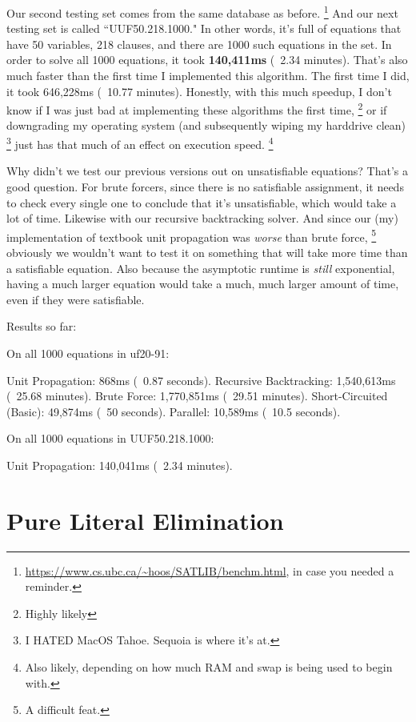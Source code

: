 \documentclass[../main.tex]{subfiles}
\begin{document}
Our second testing set comes from the same database as before.
\footnote{\url{https://www.cs.ubc.ca/~hoos/SATLIB/benchm.html}, in case you needed a reminder.}
And our next testing set is called ``UUF50.218.1000." In other words, it's full of equations that 
have 50 variables, 218 clauses, and there are 1000 such equations in the set. In order to solve 
all 1000 equations, it took \textbf{140,411ms} (~2.34 minutes). That's also much faster than the first time 
I implemented this algorithm. The first time I did, it took 646,228ms (~10.77 minutes). Honestly,
with this much speedup, I don't know if I was just bad at implementing these algorithms the first time,
\footnote{Highly likely}
or if downgrading my operating system (and subsequently wiping my harddrive clean)
\footnote{I HATED MacOS Tahoe. Sequoia is where it's at.}
just has that much of an effect on execution speed.
\footnote{Also likely, depending on how much RAM and swap is being used to begin with.}

Why didn't we test our previous versions out on unsatisfiable equations? That's a good question.
For brute forcers, since there is no satisfiable assignment, it needs to check every single 
one to conclude that it's unsatisfiable, which would take a lot of time. Likewise with our 
recursive backtracking solver. And since our (my) implementation of textbook unit propagation 
was \textit{worse} than brute force,
\footnote{A difficult feat.}
obviously we wouldn't want to test it on something that will take more time than a satisfiable 
equation. Also because the asymptotic runtime is \textit{still} exponential, having a much 
larger equation would take a much, much larger amount of time, even if they were satisfiable.

\begin{FVerbatim}
Results so far:

On all 1000 equations in uf20-91:

Unit Propagation:          868ms (~0.87 seconds).
Recursive Backtracking:    1,540,613ms (~25.68 minutes).
Brute Force:               1,770,851ms (~29.51 minutes).
Short-Circuited (Basic):   49,874ms (~50 seconds).
Parallel:                  10,589ms (~10.5 seconds).

On all 1000 equations in UUF50.218.1000:

Unit Propagation: 140,041ms (~2.34 minutes).
\end{FVerbatim}

\section{Pure Literal Elimination}
\end{document}

